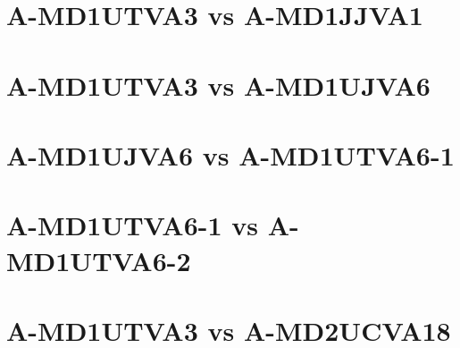 \documentclass[10pt,a4paper]{report}
\begin{document}
\section{A-MD1UTVA3 vs A-MD1JJVA1}

\section{A-MD1UTVA3 vs A-MD1UJVA6}

\section{A-MD1UJVA6 vs A-MD1UTVA6-1}

\section{A-MD1UTVA6-1 vs A-MD1UTVA6-2}

\section{A-MD1UTVA3 vs A-MD2UCVA18}
\end{document}
